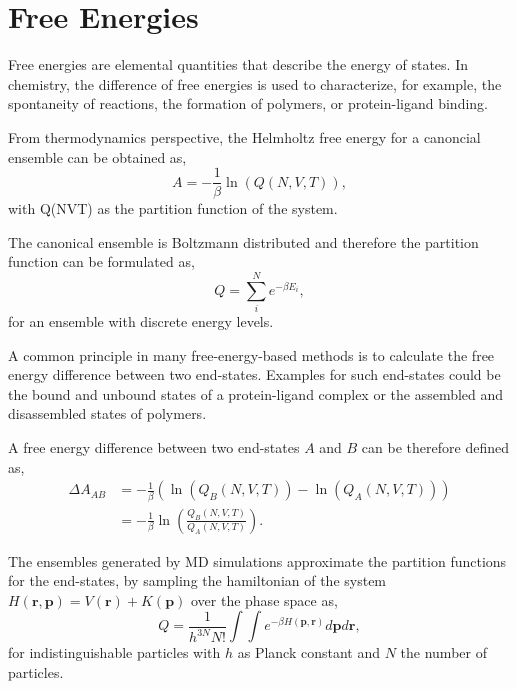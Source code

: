\section{Free Energies}
Free energies are elemental quantities that describe the energy of states. In chemistry, the difference of free energies is used to characterize, for example, the spontaneity of reactions, the formation of polymers, or protein-ligand binding.\cite{Kollman1993, Armacost2020, Christ2009, Hansen2014, Cournia2020} 

From thermodynamics perspective, the Helmholtz free energy\cite{Helmholtz1882} for a canoncial ensemble can be obtained as, 
\begin{equation}
    A =  -\frac{1}{\beta} \ln(Q(N, V, T)),
\end{equation}
with Q(NVT) as the partition function of the system. \cite{Atkins2014}

The canonical ensemble is Boltzmann distributed \cite{Boltzmann1872} and therefore the partition function can be formulated as,
\begin{equation}
    Q =\sum^N_i e^{-\beta E_i} ,
\end{equation} for an ensemble with discrete energy levels.  \cite{Atkins2014}

A common principle in many free-energy-based methods is to calculate the free energy difference between two end-states. \cite{Ytreberg2006, Kirkwood1935, Zwanzig1954} Examples for such end-states could be the bound and unbound states of a protein-ligand complex or the assembled and disassembled states of polymers. \cite{Kollman1993, Armacost2020, Christ2009, Hansen2014, Cournia2020} 

A free energy difference between two end-states $A$ and $B$ can be therefore defined as,  \cite{Atkins2014}
\begin{equation}
    \begin{split}
        \Delta A_{AB} &= -\frac{1}{\beta} (\ln( Q_B(N, V, T) ) - \ln(Q_A(N, V, T)))\\
        &= -\frac{1}{\beta} \ln(\frac{Q_B(N, V, T)}{Q_A(N, V, T)}).
    \end{split}
\end{equation}

The ensembles generated by MD simulations approximate the partition functions for the end-states, by sampling the hamiltonian of the system $H(\textbf{r},\textbf{p})=V(\textbf{r})+K(\textbf{p})$ over the phase space as,\cite{Zwanzig1954} 
\begin{equation}
    Q = \frac{1}{h^{3N} N!}  \int \int e^{-\beta H(\textbf{p},\textbf{r})} d \textbf{p} d \textbf{r} ,
\end{equation}
for indistinguishable particles with $h$ as Planck constant and $N$ the number of particles.\cite{Zwanzig1954}

